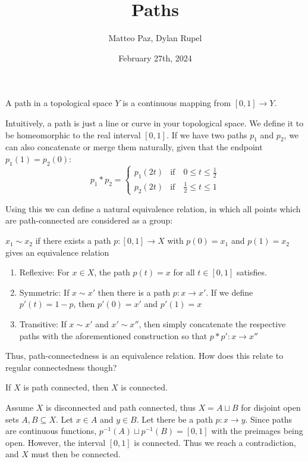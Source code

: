 \documentclass{article}
\author{Matteo Paz, Dylan Rupel}
\date{February 27th, 2024}
\title{Paths}
\begin{document}
\maketitle
\begin{definition}
    A path in a topological space $Y$ is a continuous mapping from $[0,1] \to Y$.
\end{definition}

Intuitively, a path is just a line or curve in your topological space. We define it to be homeomorphic
to the real interval $[0,1]$. If we have two paths $p_1$ and $p_2$, we can also concatenate or merge
them naturally, given that the endpoint $p_1(1) = p_2(0)$:
\[
p_1 * p_2 = 
\begin{cases} 
    p_1(2t) & \text{if} \quad 0 \leq t \leq \frac{1}{2} \\
    p_2(2t) & \text{if} \quad \frac{1}{2} \leq t \leq 1
\end{cases}
\]

Using this we can define a natural equivalence relation, in which all points which are path-connected
are considered as a group:
\begin{proposition}
    $x_1 \sim x_2$ if there exists a path $p: [0,1] \to X$ with $p(0) = x_1$ and $p(1) = x_2$ gives
    an equivalence relation
\end{proposition}
\pf
\begin{enumerate}
    \item Reflexive: For $x \in X$, the path $p(t) = x$ for all $t \in [0,1]$ satisfies.
    \item Symmetric: If $x \sim x'$ then there is a path $p: x \to x'$. If we define $p'(t) = 1-p$, then $p'(0) = x'$ and $p'(1) = x$
    \item Transitive: If $x \sim x'$ and $x' \sim x''$, then simply concatenate the respective paths with the aforementioned construction so that $p * p': x \to x''$
\end{enumerate}

Thus, path-connectedness is an equivalence relation. How does this relate to regular connectedness though?

\begin{proposition}
    If $X$ is path connected, then $X$ is connected.
\end{proposition}
\pf

Assume $X$ is disconnected and path connected, thus $X = A \sqcup B$ for disjoint open sets $A,B \subseteq X$. Let $x \in A$ and $y \in B$. Let there be a path
$p: x \to y$. Since paths are continuous functions, $p^{-1}(A) \sqcup p^{-1}(B) = [0,1]$ with the preimages being open. However, the interval $[0,1]$ is 
connected. Thus we reach a contradiction, and $X$ must then be connected. \done
\end{document}
